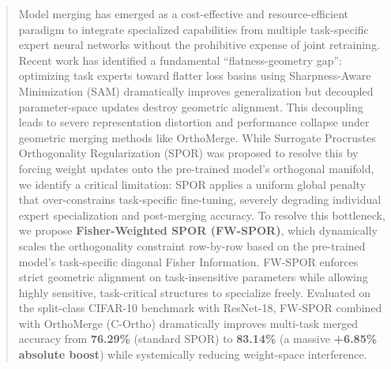 \documentclass{article}
\theoremstyle{plain}
\theoremstyle{definition}
\theoremstyle{remark}
\begin{document}

\printAffiliationsAndNotice{}


\begin{abstract}
  Model merging has emerged as a cost-effective and resource-efficient paradigm to integrate specialized capabilities from multiple task-specific expert neural networks without the prohibitive expense of joint retraining. Recent work has identified a fundamental ``flatness-geometry gap'': optimizing task experts toward flatter loss basins using Sharpness-Aware Minimization (SAM) dramatically improves generalization but decoupled parameter-space updates destroy geometric alignment. This decoupling leads to severe representation distortion and performance collapse under geometric merging methods like OrthoMerge. While Surrogate Procrustes Orthogonality Regularization (SPOR) was proposed to resolve this by forcing weight updates onto the pre-trained model's orthogonal manifold, we identify a critical limitation: SPOR applies a uniform global penalty that over-constrains task-specific fine-tuning, severely degrading individual expert specialization and post-merging accuracy. To resolve this bottleneck, we propose \textbf{Fisher-Weighted SPOR (FW-SPOR)}, which dynamically scales the orthogonality constraint row-by-row based on the pre-trained model's task-specific diagonal Fisher Information. FW-SPOR enforces strict geometric alignment on task-insensitive parameters while allowing highly sensitive, task-critical structures to specialize freely. Evaluated on the split-class CIFAR-10 benchmark with ResNet-18, FW-SPOR combined with OrthoMerge (C-Ortho) dramatically improves multi-task merged accuracy from \textbf{76.29\%} (standard SPOR) to \textbf{83.14\%} (a massive \textbf{+6.85\% absolute boost}) while systemically reducing weight-space interference.
\end{abstract}
\end{document}
